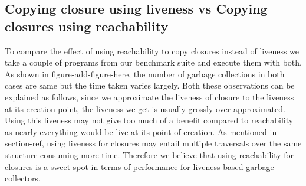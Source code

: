 \documentclass[9pt]{sigplanconf}
\newcommand{\comment}[1]{{\color{Myblue}{(#1)}}}
\begin{document}

\subsection{Copying closure using liveness vs Copying closures using reachability}
To compare the effect of using reachability to copy closures instead of liveness we take a couple of programs from our benchmark suite and execute them with 
both. As shown in figure-add-figure-here, the number of garbage collections 
in both cases are same but the time taken varies largely. Both these observations can be explained as follows, since we approximate the liveness of closure to 
the liveness at its creation point, the liveness we get is usually grossly over approximated. 
Using this liveness may not give too much of a benefit compared to reachability as nearly everything would be live at its point of creation. 
As mentioned in section-ref, using liveness for closures may entail multiple traversals over the same structure consuming more time. 
Therefore we believe that using reachability for closures is a sweet spot in terms of performance for liveness based garbage collectors. 
\end{document}
